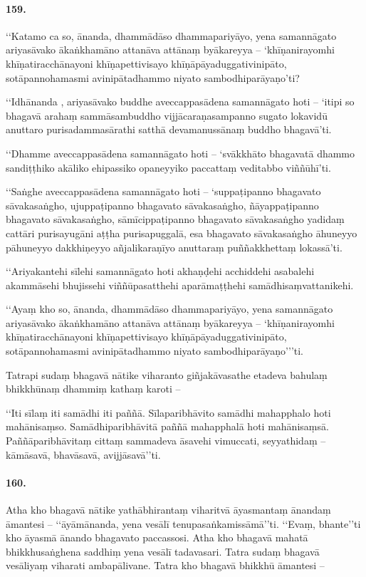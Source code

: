\paragraph{159.} ‘‘Katamo ca so, ānanda, dhammādāso dhammapariyāyo, yena samannāgato ariyasāvako ākaṅkhamāno attanāva attānaṃ byākareyya – ‘khīṇanirayomhi khīṇatiracchānayoni khīṇapettivisayo khīṇāpāyaduggativinipāto, sotāpannohamasmi avinipātadhammo niyato sambodhiparāyaṇo’ti?

‘‘Idhānanda , ariyasāvako buddhe aveccappasādena samannāgato hoti – ‘itipi so bhagavā arahaṃ sammāsambuddho vijjācaraṇasampanno sugato lokavidū anuttaro purisadammasārathi satthā devamanussānaṃ buddho bhagavā’ti.

‘‘Dhamme aveccappasādena samannāgato hoti – ‘svākkhāto bhagavatā dhammo sandiṭṭhiko akāliko ehipassiko opaneyyiko paccattaṃ veditabbo viññūhī’ti.

‘‘Saṅghe aveccappasādena samannāgato hoti – ‘suppaṭipanno bhagavato sāvakasaṅgho, ujuppaṭipanno bhagavato sāvakasaṅgho, ñāyappaṭipanno bhagavato sāvakasaṅgho, sāmīcippaṭipanno bhagavato sāvakasaṅgho yadidaṃ cattāri purisayugāni aṭṭha purisapuggalā, esa bhagavato sāvakasaṅgho āhuneyyo pāhuneyyo dakkhiṇeyyo añjalikaraṇīyo anuttaraṃ puññakkhettaṃ lokassā’ti.

‘‘Ariyakantehi sīlehi samannāgato hoti akhaṇḍehi acchiddehi asabalehi akammāsehi bhujissehi viññūpasatthehi aparāmaṭṭhehi samādhisaṃvattanikehi.

‘‘Ayaṃ kho so, ānanda, dhammādāso dhammapariyāyo, yena samannāgato ariyasāvako ākaṅkhamāno attanāva attānaṃ byākareyya – ‘khīṇanirayomhi khīṇatiracchānayoni khīṇapettivisayo khīṇāpāyaduggativinipāto, sotāpannohamasmi avinipātadhammo niyato sambodhiparāyaṇo’’’ti.

Tatrapi sudaṃ bhagavā nātike viharanto giñjakāvasathe etadeva bahulaṃ bhikkhūnaṃ dhammiṃ kathaṃ karoti –

‘‘Iti sīlaṃ iti samādhi iti paññā. Sīlaparibhāvito samādhi mahapphalo hoti mahānisaṃso. Samādhiparibhāvitā paññā mahapphalā hoti mahānisaṃsā. Paññāparibhāvitaṃ cittaṃ sammadeva āsavehi vimuccati, seyyathidaṃ – kāmāsavā, bhavāsavā, avijjāsavā’’ti.

\paragraph{160.} Atha kho bhagavā nātike yathābhirantaṃ viharitvā āyasmantaṃ ānandaṃ āmantesi – ‘‘āyāmānanda, yena vesālī tenupasaṅkamissāmā’’ti. ‘‘Evaṃ, bhante’’ti kho āyasmā ānando bhagavato paccassosi. Atha kho bhagavā mahatā bhikkhusaṅghena saddhiṃ yena vesālī tadavasari. Tatra sudaṃ bhagavā vesāliyaṃ viharati ambapālivane. Tatra kho bhagavā bhikkhū āmantesi –

